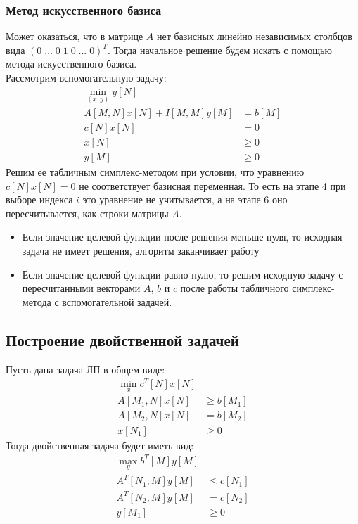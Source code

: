 \subsubsection{Метод искусственного базиса}
Может оказаться, что в матрице $A$ нет базисных линейно независимых столбцов вида $(0\;...\;0\;1\;0\;...\;0)^T$. Тогда начальное решение будем искать с помощью метода искусственного базиса.\\
Рассмотрим вспомогательную задачу:\\
\begin{align*} 
\min_{(x,y)} y[N] \\
A[M,N]x[N]+I[M,M]y[M] &= b[M] \\
c[N]x[N]&=0 \\
x[N] &\geq 0 \\
y[M] &\geq 0
\end{align*}
Решим ее табличным симплекс-методом при условии, что уравнению $c[N]x[N]=0$ не соответствует базисная переменная. То есть на этапе 4 при выборе индекса $i$ это уравнение не учитывается, а на этапе 6 оно пересчитывается, как строки матрицы $A$.\\
\begin{itemize}
	\item Если значение целевой функции после решения меньше нуля, то исходная задача не имеет решения, алгоритм заканчивает работу
	\item Если значение целевой функции равно нулю, то решим исходную задачу с пересчитанными векторами $A$, $b$ и $c$ после работы табличного симплекс-метода с вспомогательной задачей.
\end{itemize}

\subsection{Построение двойственной задачей}
Пусть дана задача ЛП в общем виде:
\begin{align*} 
\min_x c^T[N]x[N] \\
A[M_1,N]x[N]&\geq b[M_1] \\
A[M_2,N]x[N]&=b[M_2] \\
x[N_1]&\geq 0
\end{align*}
Тогда двойственная задача будет иметь вид:
\begin{align*} 
\max_y b^T[M]y[M] \\
A^T[N_1,M]y[M] &\leq c[N_1] \\
A^T[N_2,M]y[M] &= c[N_2] \\
y[M_1]&\geq 0
\end{align*}

